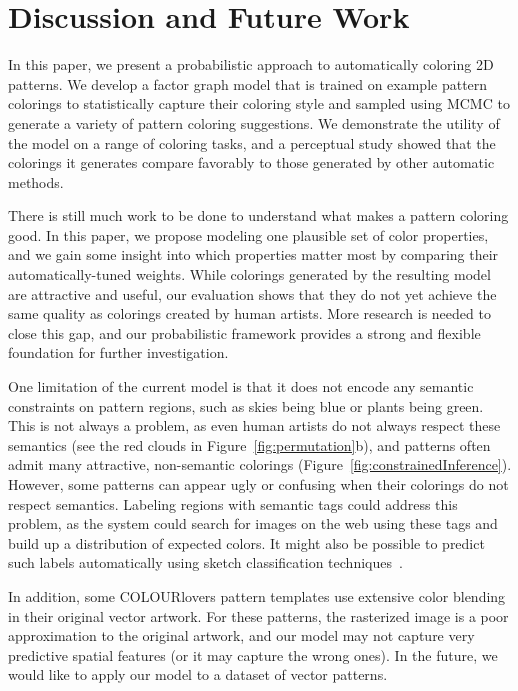\section{Discussion and Future Work}
\label{sec:discussion}

In this paper, we present a probabilistic approach to automatically coloring 2D patterns. We develop a factor graph model that is trained on example pattern colorings to statistically capture their coloring style and sampled using MCMC to generate a variety of pattern coloring suggestions. We demonstrate the utility of the model on a range of coloring tasks, and a perceptual study showed that the colorings it generates compare favorably to those generated by other automatic methods.

There is still much work to be done to understand what makes a pattern coloring good. In this paper, we propose modeling one plausible set of color properties, and we gain some insight into which properties matter most by comparing their automatically-tuned weights. While colorings generated by the resulting model are attractive and useful, our evaluation shows that they do not yet achieve the same quality as colorings created by human artists. More research is needed to close this gap, and our probabilistic framework provides a strong and flexible foundation for further investigation.

One limitation of the current model is that it does not encode any semantic constraints on pattern regions, such as skies being blue or plants being green. This is not always a problem, as even human artists do not always respect these semantics (see the red clouds in Figure~\ref{fig:permutation}b), and patterns often admit many attractive, non-semantic colorings (Figure~\ref{fig:constrainedInference}). However, some patterns can appear ugly or confusing when their colorings do not respect semantics.
Labeling regions with semantic tags could address this problem, as the system could search for images on the web using these tags and build up a distribution of expected colors. It might also be possible to predict such labels automatically using sketch classification techniques~\cite{SketchClassification}.

In addition, some COLOURlovers pattern templates use extensive color blending in their original vector artwork. For these patterns, the rasterized image is a poor approximation to the original artwork, and our model may not capture very predictive spatial features (or it may capture the wrong ones). In the future, we would like to apply our model to a dataset of vector patterns.

